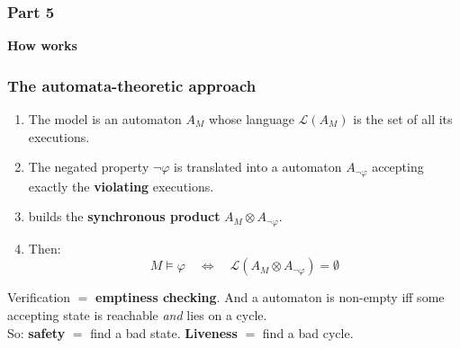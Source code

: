 \begin{frame}
  \frametitle{Part 5}

{\Large\bf How \spin{} works}

\end{frame}

\begin{frame}
  \frametitle{The automata-theoretic approach} \small

\begin{enumerate}
\item The \promelaname{} model is an automaton $A_M$ whose language
      $\mathcal{L}(A_M)$ is the set of all its executions.
\pause
\item The negated property $\neg\varphi$ is translated into a \buchi{} automaton
      $A_{\neg\varphi}$ accepting exactly the {\bf violating} executions.
\pause
\item \spin{} builds the {\bf synchronous product} $A_M \otimes A_{\neg\varphi}$.
\pause
\item Then:
\[
M \models \varphi
\quad\Longleftrightarrow\quad
\mathcal{L}(A_M \otimes A_{\neg\varphi}) = \emptyset
\]
\end{enumerate}

\pause
\vspace{0.4cm}

\begin{block}{}\small
Verification $=$ {\bf emptiness checking}. And a \buchi{} automaton is non-empty
iff some accepting state is reachable {\em and} lies on a cycle.\\[0.2cm]
So: {\bf safety} $=$ find a bad state. {\bf Liveness} $=$ find a bad cycle.
\end{block}

\end{frame}

